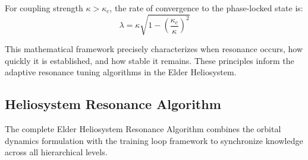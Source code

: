 \begin{corollary}
For coupling strength $\kappa > \kappa_c$, the rate of convergence to the phase-locked state is:
\begin{equation}
\lambda = \kappa\sqrt{1 - \left(\frac{\kappa_c}{\kappa}\right)^2}
\end{equation}
\end{corollary}

This mathematical framework precisely characterizes when resonance occurs, how quickly it is established, and how stable it remains. These principles inform the adaptive resonance tuning algorithms in the Elder Heliosystem.

\subsection{Heliosystem Resonance Algorithm}

The complete Elder Heliosystem Resonance Algorithm combines the orbital dynamics formulation with the training loop framework to synchronize knowledge across all hierarchical levels.

